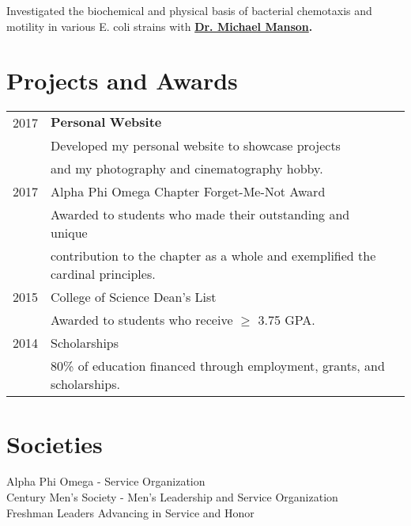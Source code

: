 \documentclass[]{vishrutrao-resume}
\begin{document}
\begin{minipage}[t]{0.66\textwidth}
\begin{tightemize}\item Investigated the biochemical and physical basis of bacterial chemotaxis and motility in various E. coli strains with  \textbf{\href{https://biochemistry.tamu.edu/people/manson-michael/}{Dr. Michael Manson}.}
\end{tightemize}
\sectionsep


\section{Projects and Awards} 
\begin{tabular}{rll}
2017	     & $\textbf{Personal Website}$ \\
             & Developed my personal website to showcase projects \\
             & and my photography and cinematography hobby.\\
2017	     & Alpha Phi Omega Chapter Forget-Me-Not Award\\
             & Awarded to students who made their outstanding and unique \\
             & contribution to the chapter as a whole and exemplified the cardinal principles. \\
2015	     & College of Science Dean's List\\
             & Awarded to students who receive $\geq$ 3.75 GPA.\\
2014	     & Scholarships\\
             & 80\% of education financed through employment, grants, and scholarships. \\ 

\end{tabular}
\sectionsep


\section{Societies} 

Alpha Phi Omega - Service Organization\\
Century Men's Society - Men's Leadership and Service Organization \\
Freshman Leaders Advancing in Service and Honor \\

\sectionsep

\end{minipage} 
\end{document}
